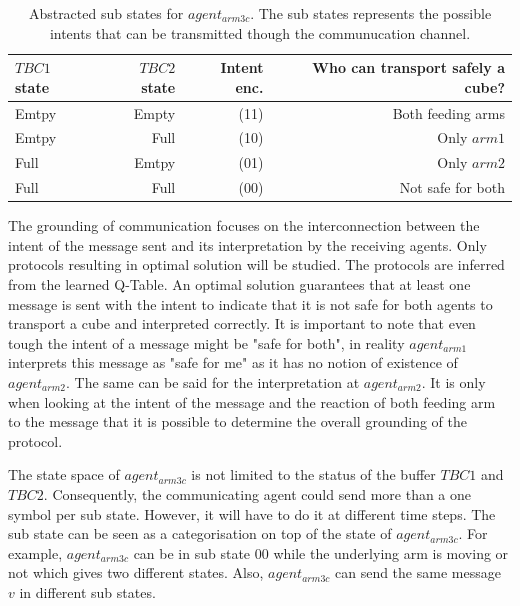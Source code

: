 \begin{table}[H]
    \centering
    \begin{tabular}{lrrr}
        \toprule
        $TBC1$ state & $TBC2$ state & Intent enc. & Who can transport safely a cube? \\
        \midrule
        Emtpy & Empty & (11) & Both feeding arms \\
        Emtpy & Full &  (10) & Only $arm1$ \\
        Full & Emtpy & (01) & Only $arm2$ \\
        Full & Full & (00) & Not safe for both \\
        \bottomrule
    \end{tabular}
    \caption[Abstracted sub states for $agent_{arm3c}$]{Abstracted sub states for $agent_{arm3c}$. The sub states represents the possible intents that can be transmitted though the communucation channel.}
    \label{tab:agent3c-substate}
\end{table}

The grounding of communication focuses on the interconnection between the intent of the message sent and its interpretation by the receiving agents. Only protocols resulting in optimal solution will be studied. The protocols are inferred from the learned Q-Table. An optimal solution guarantees that at least one message is sent with the intent to indicate that it is not safe for both agents to transport a cube and interpreted correctly. It is important to note that even tough the intent of a message might be "safe for both", in reality $agent_{arm1}$ interprets this message as "safe for me" as it has no notion of existence of $agent_{arm2}$. The same can be said for the interpretation at $agent_{arm2}$. It is only when looking at the intent of the message and the reaction of both feeding arm to the message that it is possible to determine the overall grounding of the protocol.

The state space of $agent_{arm3c}$ is not limited to the status of the buffer $TBC1$ and $TBC2$. Consequently, the communicating agent could send more than a one symbol per sub state. However, it will have to do it at different time steps. The sub state can be seen as a categorisation on top of the state of $agent_{arm3c}$. For example, $agent_{arm3c}$ can be in sub state $00$ while the underlying arm is moving or not which gives two different states. Also, $agent_{arm3c}$ can send the same message $v$ in different sub states.

